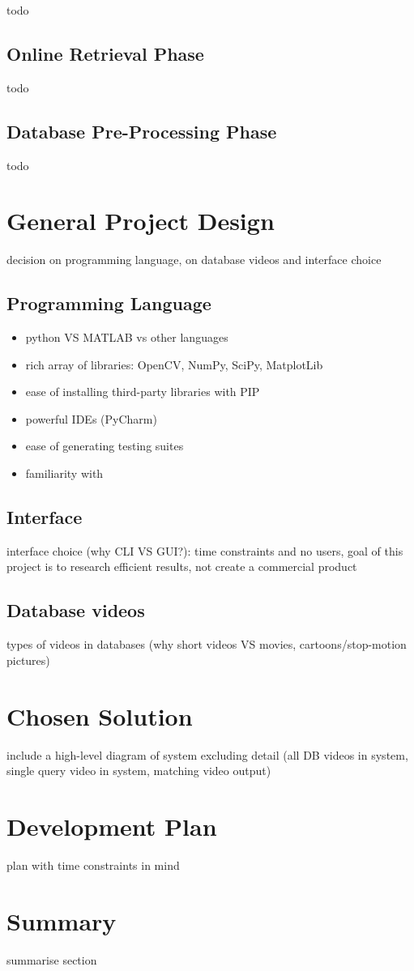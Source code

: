todo

\subsection{Online Retrieval Phase}

todo

\subsection{Database Pre-Processing Phase}

todo

\section{General Project Design}

decision on programming language, on database videos and interface choice

\subsection{Programming Language}

\begin{itemize}
	\item python VS MATLAB vs other languages
	\item rich array of libraries: OpenCV, NumPy, SciPy, MatplotLib
	\item ease of installing third-party libraries with PIP
	\item powerful IDEs (PyCharm)
	\item ease of generating testing suites
     \item familiarity with
\end{itemize}

\subsection{Interface}

interface choice (why CLI VS GUI?): time constraints and no users, goal of this project is to research efficient results, not create a commercial product

\subsection{Database videos}

types of videos in databases (why short videos VS movies, cartoons/stop-motion pictures)

\section{Chosen Solution}

include a high-level diagram of system excluding detail (all DB videos in system, single query video in system, matching video output)

\section{Development Plan}

plan with time constraints in mind

\section{Summary}

summarise section

